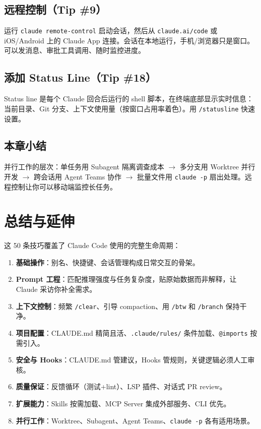 \documentclass[a4paper]{article}
\begin{document}
\subsection{远程控制（Tip \#9）}

运行 \texttt{claude remote-control} 启动会话，然后从 \texttt{claude.ai/code} 或 iOS/Android 上的 Claude App 连接。会话在本地运行，手机/浏览器只是窗口。可以发消息、审批工具调用、随时监控进度。

\subsection{添加 Status Line（Tip \#18）}

Status line 是每个 Claude 回合后运行的 shell 脚本，在终端底部显示实时信息：当前目录、Git 分支、上下文使用量（按窗口占用率着色）。用 \texttt{/statusline} 快速设置。

\subsection{本章小结}

并行工作的层次：单任务用 Subagent 隔离调查成本 $\to$ 多分支用 Worktree 并行开发 $\to$ 跨会话用 Agent Teams 协作 $\to$ 批量文件用 \texttt{claude -p} 扇出处理。远程控制让你可以移动端监控长任务。

\section{总结与延伸}

这 50 条技巧覆盖了 Claude Code 使用的完整生命周期：

\begin{enumerate}
  \item \textbf{基础操作}：别名、快捷键、会话管理构成日常交互的骨架。
  \item \textbf{Prompt 工程}：匹配推理强度与任务复杂度，贴原始数据而非解释，让 Claude 采访你补全需求。
  \item \textbf{上下文控制}：频繁 \texttt{/clear}、引导 compaction、用 \texttt{/btw} 和 \texttt{/branch} 保持干净。
  \item \textbf{项目配置}：CLAUDE.md 精简且活、\texttt{.claude/rules/} 条件加载、\texttt{@imports} 按需引入。
  \item \textbf{安全与 Hooks}：CLAUDE.md 管建议，Hooks 管规则，关键逻辑必须人工审核。
  \item \textbf{质量保证}：反馈循环（测试+lint）、LSP 插件、对话式 PR review。
  \item \textbf{扩展能力}：Skills 按需加载、MCP Server 集成外部服务、CLI 优先。
  \item \textbf{并行工作}：Worktree、Subagent、Agent Teams、\texttt{claude -p} 各有适用场景。
\end{enumerate}
\end{document}
